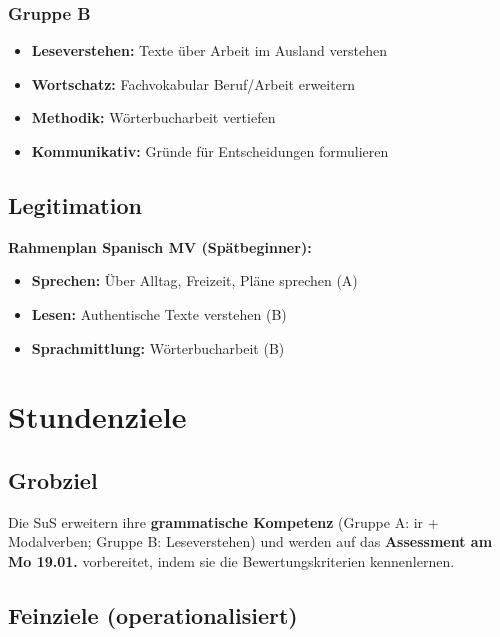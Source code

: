 \documentclass[11pt,a4paper]{article}
\begin{document}
\subsubsection{Gruppe B}
\begin{itemize}
    \item \textbf{Leseverstehen:} Texte über Arbeit im Ausland verstehen
    \item \textbf{Wortschatz:} Fachvokabular Beruf/Arbeit erweitern
    \item \textbf{Methodik:} Wörterbucharbeit vertiefen
    \item \textbf{Kommunikativ:} Gründe für Entscheidungen formulieren
\end{itemize}

\subsection{Legitimation}

\textbf{Rahmenplan Spanisch MV (Spätbeginner):}
\begin{itemize}
    \item \textbf{Sprechen:} Über Alltag, Freizeit, Pläne sprechen (A)
    \item \textbf{Lesen:} Authentische Texte verstehen (B)
    \item \textbf{Sprachmittlung:} Wörterbucharbeit (B)
\end{itemize}

\section{Stundenziele}

\subsection{Grobziel}
Die SuS erweitern ihre \textbf{grammatische Kompetenz} (Gruppe A: ir + Modalverben; Gruppe B: Leseverstehen) und werden auf das \textbf{Assessment am Mo 19.01.} vorbereitet, indem sie die Bewertungskriterien kennenlernen.

\subsection{Feinziele (operationalisiert)}
\end{document}
